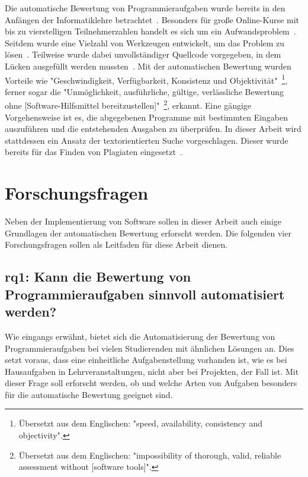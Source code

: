 Die automatische Bewertung von Programmieraufgaben wurde bereits in den Anfängen der Informatiklehre betrachtet~\cite{hollingsworth-1960}.
Besonders für große Online-Kurse mit bis zu vierstelligen Teilnehmerzahlen handelt es sich um ein Aufwandsproblem~\cite{pieterse-2013}.
Seitdem wurde eine Vielzahl von Werkzeugen entwickelt, um das Problem zu lösen~\cite{jackson-1997-assyst,edwards-2008-web-cat,enstroem-et-al-2011,vander-zanden-2012}.
Teilweise wurde dabei unvollständiger Quellcode vorgegeben, in dem Lücken ausgefüllt werden mussten~\cite{vander-zanden-2012}.
Mit der automatischen Bewertung wurden Vorteile wie "Geschwindigkeit, Verfügbarkeit, Konsistenz und Objektivität"~\cite{ala-mutka-2005}\footnote{
    Übersetzt aus dem Englischen: "speed, availability, consistency and objectivity".
}, ferner sogar die "Unmöglichkeit, ausführliche, gültige, verlässliche Bewertung ohne [Software-Hilfsmittel bereitzustellen]"~\cite{kay-1994}\footnote{
    Übersetzt aus dem Englischen: "impossibility of thorough, valid, reliable assessment without [software tools]".
}, erkannt.
Eine gängige Vorgehensweise ist es, die abgegebenen Programme mit bestimmten Eingaben auszuführen und die entstehenden Ausgaben zu überprüfen.
In dieser Arbeit wird stattdessen ein Ansatz der textorientierten Suche vorgeschlagen.
Dieser wurde bereits für das Finden von Plagiaten eingesetzt~\cite{aiken-2002,prechelt-2003}.

\section{Forschungsfragen}\label{sec:research-questions}

Neben der Implementierung von Software sollen in dieser Arbeit auch einige Grundlagen der automatischen Bewertung erforscht werden.
Die folgenden vier Forschungsfragen sollen als Leitfaden für diese Arbeit dienen.

\subsection[\acs{rq}1]{\ac{rq}1: Kann die Bewertung von Programmieraufgaben sinnvoll automatisiert werden?}\label{subsec:rq1-useful-automation}

Wie eingangs erwähnt, bietet sich die Automatisierung der Bewertung von Programmieraufgaben bei vielen Studierenden mit ähnlichen Lösungen an.
Dies setzt voraus, dass eine einheitliche Aufgabenstellung vorhanden ist, wie es bei Hausaufgaben in Lehrveranstaltungen, nicht aber bei Projekten, der Fall ist.
Mit dieser Frage soll erforscht werden, ob und welche Arten von Aufgaben besonders für die automatische Bewertung geeignet sind.

